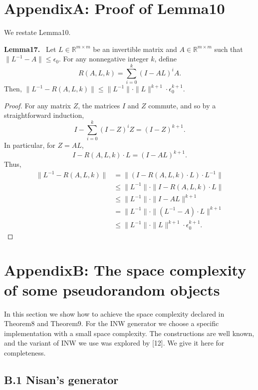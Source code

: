 \documentclass[10pt,a4paper]{article}
\newenvironment{authorclaim}[1]{\par\medskip\noindent\textbf{#1.}\ }{\par\medskip}
\begin{document}
\section*{AppendixA: Proof of Lemma10}
We restate Lemma10.
\begin{authorclaim}{Lemma17}
Let $L\in\mathbb R^{m\times m}$ be an invertible matrix and $A\in\mathbb R^{m\times m}$ such that $\|L^{-1}-A\|\le\epsilon_0$. For any nonnegative integer $k$, define
\[R(A,L,k)=\sum_{i=0}^k(I-AL)^iA.\]
Then, $\|L^{-1}-R(A,L,k)\|\le\|L^{-1}\|\cdot\|L\|^{k+1}\cdot\epsilon_0^{k+1}$.
\end{authorclaim}
\begin{proof}
For any matrix $Z$, the matrices $I$ and $Z$ commute, and so by a straightforward induction,
\[I-\sum_{i=0}^k(I-Z)^iZ=(I-Z)^{k+1}.\]
In particular, for $Z=AL$,
\[I-R(A,L,k)\cdot L=(I-AL)^{k+1}.\]
Thus,
\begin{align*}
\|L^{-1}-R(A,L,k)\|&=\|(I-R(A,L,k)\cdot L)\cdot L^{-1}\|\\
&\le\|L^{-1}\|\cdot\|I-R(A,L,k)\cdot L\|\\
&\le\|L^{-1}\|\cdot\|I-AL\|^{k+1}\\
&=\|L^{-1}\|\cdot\|(L^{-1}-A)\cdot L\|^{k+1}\\
&\le\|L^{-1}\|\cdot\|L\|^{k+1}\cdot\epsilon_0^{k+1}.
\end{align*}
\end{proof}
\section*{AppendixB: The space complexity of some pseudorandom objects}
In this section we show how to achieve the space complexity declared in Theorem8 and Theorem9. For the INW generator we choose a specific implementation with a small space complexity. The constructions are well known, and the variant of INW we use was explored by [12]. We give it here for completeness.
\subsection*{B.1 Nisan's generator}
\end{document}
